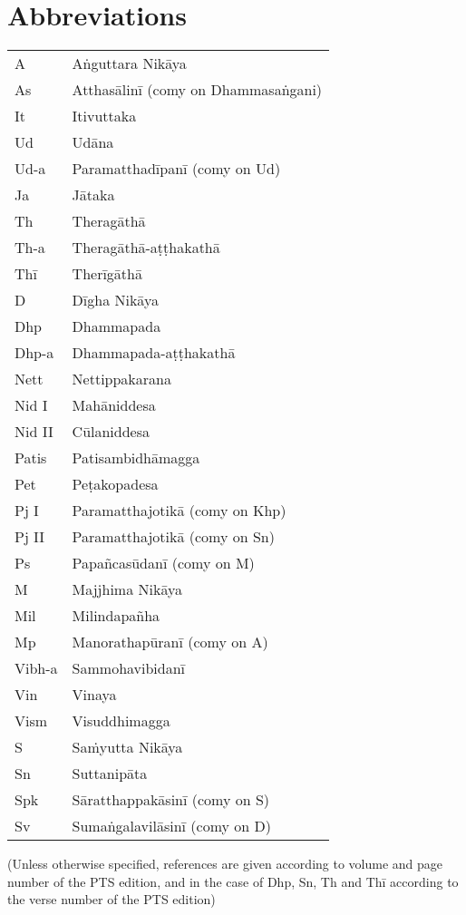 \chapter{Abbreviations}

{\fontsize{9.5}{14}\selectfont

\hspace*{\quoteMargin}%
\begin{tabular}{@{}ll@{}}
A & Aṅguttara Nikāya \\
As & Atthasālinī (comy on Dhammasaṅgani) \\
It & Itivuttaka \\
Ud & Udāna \\
Ud-a & Paramatthadīpanī (comy on Ud) \\
Ja & Jātaka \\
Th & Theragāthā \\
Th-a & Theragāthā-aṭṭhakathā \\
Thī & Therīgāthā \\
D & Dīgha Nikāya \\
Dhp & Dhammapada \\
Dhp-a & Dhammapada-aṭṭhakathā \\
Nett & Nettippakarana \\
Nid I & Mahāniddesa \\
Nid II & Cūlaniddesa \\
Patis & Patisambidhāmagga \\
Pet & Peṭakopadesa \\
Pj I & Paramatthajotikā (comy on Khp) \\
Pj II & Paramatthajotikā (comy on Sn) \\
Ps & Papañcasūdanī (comy on M) \\
M & Majjhima Nikāya \\
Mil & Milindapañha \\
Mp & Manorathapūranī (comy on A) \\
Vibh-a & Sammohavibidanī \\
Vin & Vinaya \\
Vism & Visuddhimagga \\
S & Saṁyutta Nikāya \\
Sn & Suttanipāta \\
Spk & Sāratthappakāsinī (comy on S) \\
Sv & Sumaṅgalavilāsinī (comy on D) \\
\end{tabular}

\bigskip

(Unless otherwise specified, references are given according to volume and page number of the PTS edition, and in the case of Dhp, Sn, Th and Thī according to the verse number of the PTS edition)

}
